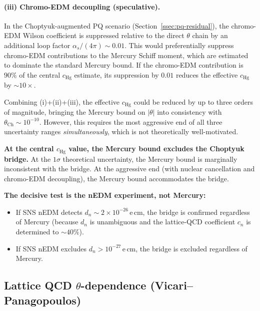 \paragraph{(iii) Chromo-EDM decoupling (speculative).}
In the Choptyuk-augmented PQ scenario (Section~\ref{ssec:pq-residual}),
the chromo-EDM Wilson coefficient is suppressed relative to the direct
$\theta$ chain by an additional loop factor $\alpha_s/(4\pi)\sim 0.01$.
This would preferentially suppress chromo-EDM contributions to the
Mercury Schiff moment, which are estimated to dominate the standard
Mercury bound.  If the chromo-EDM contribution is $90\%$ of the central
$c_{\mathrm{Hg}}$ estimate, its suppression by $0.01$ reduces the
effective $c_{\mathrm{Hg}}$ by $\sim 10\times$.

\begin{verdict}
Combining (i)+(ii)+(iii), the effective $c_{\mathrm{Hg}}$ could be
reduced by up to three orders of magnitude, bringing the Mercury bound
on $|\theta|$ into consistency with $\theta_{\mathrm{Ch}}\sim 10^{-10}$.
However, this requires the most aggressive end of all three uncertainty
ranges \emph{simultaneously}, which is not theoretically well-motivated.

\textbf{At the central $c_{\mathrm{Hg}}$ value, the Mercury bound
excludes the Choptyuk bridge.}  At the $1\sigma$ theoretical
uncertainty, the Mercury bound is marginally inconsistent with the
bridge.  At the aggressive end (with nuclear cancellation and
chromo-EDM decoupling), the Mercury bound accommodates the bridge.

\textbf{The decisive test is the nEDM experiment, not Mercury:}
\begin{itemize}[leftmargin=2em,itemsep=0.1em]
  \item If SNS nEDM detects $d_n\sim 2\times 10^{-26}\,$e\,cm, the
        bridge is confirmed regardless of Mercury (because $d_n$ is
        unambiguous and the lattice-QCD coefficient $c_n$ is determined
        to $\sim 40\%$).
  \item If SNS nEDM excludes $d_n>10^{-27}\,$e\,cm, the bridge is
        excluded regardless of Mercury.
\end{itemize}
\end{verdict}

\subsection{Lattice QCD \texorpdfstring{$\theta$}{theta}-dependence (Vicari--Panagopoulos)}
\label{ssec:lattice-theta}


